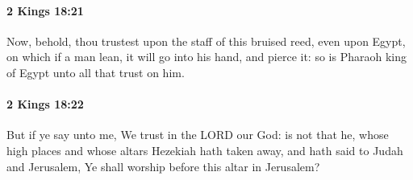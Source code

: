 		\paragraph{2 Kings 18:21} %
			\label{2KINGS-18-21}

			Now, behold, thou trustest upon the staff of this bruised reed, even upon Egypt, on which if a man lean, it will go into his hand, and pierce it: so is Pharaoh king of Egypt unto all that trust on him.


		\paragraph{2 Kings 18:22} %
			\label{2KINGS-18-22}

			But if ye say unto me, We trust in the LORD our God: is not that he, whose high places and whose altars Hezekiah hath taken away, and hath said to Judah and Jerusalem, Ye shall worship before this altar in Jerusalem?

